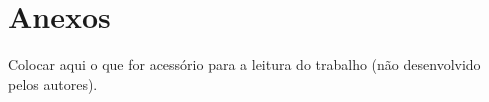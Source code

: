 \chapter*{Anexos}

Colocar aqui o que for acessório para a leitura do trabalho (não desenvolvido pelos autores).
